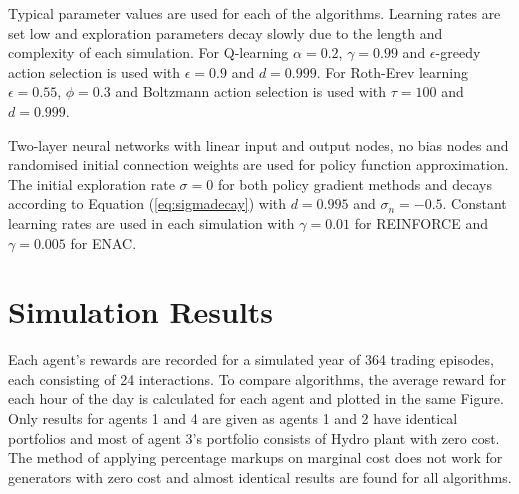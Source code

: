 Typical parameter values are used for each of the algorithms.  Learning rates
are set low and exploration parameters decay slowly due to the length
and complexity of each simulation.  For Q-learning $\alpha=0.2$, $\gamma=0.99$
and $\epsilon$-greedy action selection is used with $\epsilon=0.9$ and
$d=0.999$. For Roth-Erev learning $\epsilon=0.55$, $\phi=0.3$ and Boltzmann
action selection is used with $\tau=100$ and $d=0.999$.

Two-layer neural networks with linear input and output nodes, no bias nodes and
randomised initial connection weights are used for policy function
approximation.  The initial exploration rate $\sigma=0$ for both policy
gradient methods and decays according to Equation (\ref{eq:sigmadecay}) with
$d=0.995$ and $\sigma_n=-0.5$.  Constant learning rates are used in each
simulation with $\gamma=0.01$ for REINFORCE and $\gamma=0.005$ for ENAC.

\section{Simulation Results}
Each agent's rewards are recorded for a simulated year of 364 trading episodes,
each consisting of 24 interactions.  To compare algorithms, the average reward
for each hour of the day is calculated for each agent and plotted in the
same Figure.  Only results for agents 1 and 4 are given as agents 1 and 2 have
identical portfolios and most of agent 3's portfolio consists of Hydro plant
with zero cost.  The method of applying percentage markups on marginal cost does
not work for generators with zero cost and almost identical results are found
for all algorithms.


